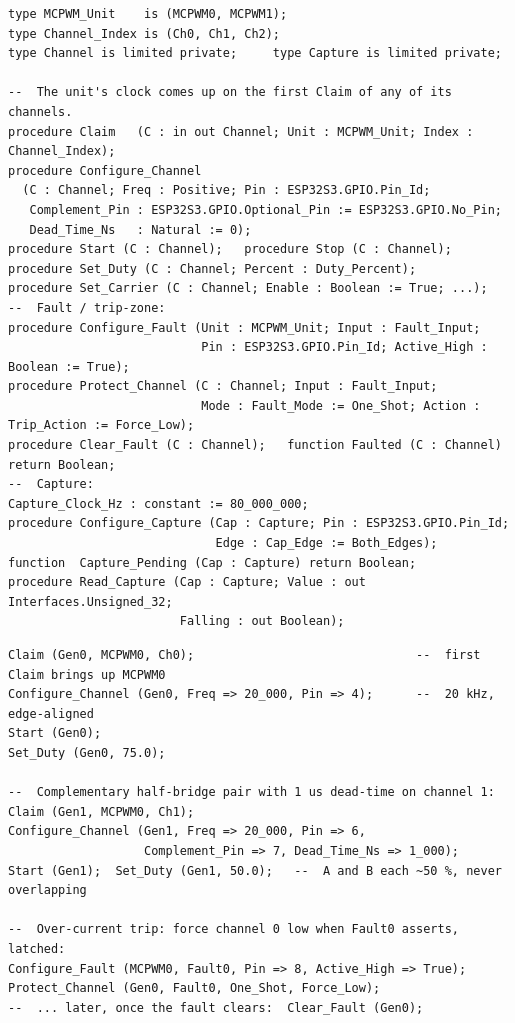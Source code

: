 \begin{lstlisting}
type MCPWM_Unit    is (MCPWM0, MCPWM1);
type Channel_Index is (Ch0, Ch1, Ch2);
type Channel is limited private;     type Capture is limited private;

--  The unit's clock comes up on the first Claim of any of its channels.
procedure Claim   (C : in out Channel; Unit : MCPWM_Unit; Index : Channel_Index);
procedure Configure_Channel
  (C : Channel; Freq : Positive; Pin : ESP32S3.GPIO.Pin_Id;
   Complement_Pin : ESP32S3.GPIO.Optional_Pin := ESP32S3.GPIO.No_Pin;
   Dead_Time_Ns   : Natural := 0);
procedure Start (C : Channel);   procedure Stop (C : Channel);
procedure Set_Duty (C : Channel; Percent : Duty_Percent);
procedure Set_Carrier (C : Channel; Enable : Boolean := True; ...);
--  Fault / trip-zone:
procedure Configure_Fault (Unit : MCPWM_Unit; Input : Fault_Input;
                           Pin : ESP32S3.GPIO.Pin_Id; Active_High : Boolean := True);
procedure Protect_Channel (C : Channel; Input : Fault_Input;
                           Mode : Fault_Mode := One_Shot; Action : Trip_Action := Force_Low);
procedure Clear_Fault (C : Channel);   function Faulted (C : Channel) return Boolean;
--  Capture:
Capture_Clock_Hz : constant := 80_000_000;
procedure Configure_Capture (Cap : Capture; Pin : ESP32S3.GPIO.Pin_Id;
                             Edge : Cap_Edge := Both_Edges);
function  Capture_Pending (Cap : Capture) return Boolean;
procedure Read_Capture (Cap : Capture; Value : out Interfaces.Unsigned_32;
                        Falling : out Boolean);
\end{lstlisting}

\begin{lstlisting}
Claim (Gen0, MCPWM0, Ch0);                               --  first Claim brings up MCPWM0
Configure_Channel (Gen0, Freq => 20_000, Pin => 4);      --  20 kHz, edge-aligned
Start (Gen0);
Set_Duty (Gen0, 75.0);

--  Complementary half-bridge pair with 1 us dead-time on channel 1:
Claim (Gen1, MCPWM0, Ch1);
Configure_Channel (Gen1, Freq => 20_000, Pin => 6,
                   Complement_Pin => 7, Dead_Time_Ns => 1_000);
Start (Gen1);  Set_Duty (Gen1, 50.0);   --  A and B each ~50 %, never overlapping

--  Over-current trip: force channel 0 low when Fault0 asserts, latched:
Configure_Fault (MCPWM0, Fault0, Pin => 8, Active_High => True);
Protect_Channel (Gen0, Fault0, One_Shot, Force_Low);
--  ... later, once the fault clears:  Clear_Fault (Gen0);
\end{lstlisting}

